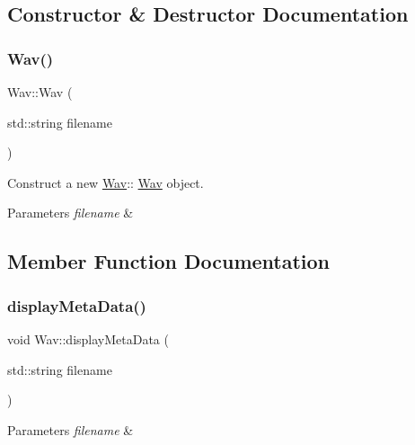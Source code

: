 \subsection{Constructor \& Destructor Documentation}
\mbox{\label{classWav_a2fee69ab4985c3a3a2a6688a758830e4}} 
\subsubsection{\texorpdfstring{Wav()}{Wav()}}
{\footnotesize\ttfamily Wav\+::\+Wav (\begin{DoxyParamCaption}\item[{std\+::string}]{filename }\end{DoxyParamCaption})}



Construct a new \hyperlink{classWav}{Wav}\+:\+: \hyperlink{classWav}{Wav} object. 


\begin{DoxyParams}{Parameters}
{\em filename} & \\
\hline
\end{DoxyParams}


\subsection{Member Function Documentation}
\mbox{\label{classWav_abe9ad7fffa63c476065c42b73ec157fb}} 
\subsubsection{\texorpdfstring{display\+Meta\+Data()}{displayMetaData()}}
{\footnotesize\ttfamily void Wav\+::display\+Meta\+Data (\begin{DoxyParamCaption}\item[{std\+::string}]{filename }\end{DoxyParamCaption})}


\begin{DoxyParams}{Parameters}
{\em filename} & \\
\hline
\end{DoxyParams}
\mbox{\label{classWav_aa713fc552ec8d011df0acede14d23295}} 
